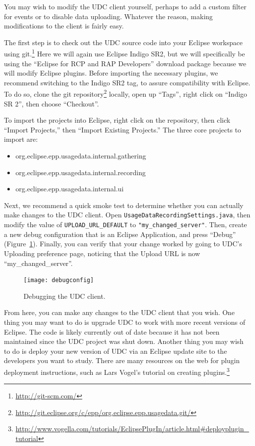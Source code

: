 You may wish to modify the UDC client yourself, perhaps to add a custom filter for events
or to disable data uploading.
Whatever the reason, making modifications to the client is fairly easy.

The first step is to check out the UDC source code into your Eclipse
workspace using git.\footnote{\url{http://git-scm.com/}}
Here we will again use Eclipse Indigo SR2, but we will specifically be using the 
``Eclipse for RCP and RAP Developers'' download package because we will
modify Eclipse plugins.
Before importing the necessary plugins, we recommend switching to 
the Indigo SR2 tag, to assure compatibility with
Eclipse.
To do so, clone the git repository\footnote{\url{http://git.eclipse.org/c/epp/org.eclipse.epp.usagedata.git/}} 
locally, open up ``Tags'', right click on ``Indigo SR 2'',
then choose ``Checkout''.

To import the projects into Eclipse, right click on the repository, then click 
``Import Projects,'' then ``Import Existing Projects.''
The three core projects to import are:

\begin{itemize}
\item org.eclipse.epp.usagedata.internal.gathering
\item org.eclipse.epp.usagedata.internal.recording
\item org.eclipse.epp.usagedata.internal.ui
\end{itemize}

Next, we recommend a quick smoke test to determine whether you 
can actually make changes to the UDC client.
Open \texttt{UsageDataRecordingSettings.java}, then modify the value of \texttt{UPLOAD\_URL\_DEFAULT}
to \texttt{"my\_changed\_server"}.
Then, create a new debug configuration that is an Eclipse Application, and press 
``Debug'' (Figure~\ref{fig:debugconfig}).
Finally, you can verify that your change worked by going to UDC's Uploading 
preference page, noticing that the Upload URL is now ``my\_changed\_server''.

\begin{figure}
  \centering
  \texttt{[image: debugconfig]}
  \caption{Debugging the UDC client.}\label{fig:debugconfig}
\end{figure}

From here, you can make any changes to the UDC client that you wish.
One thing you may want to do is upgrade UDC to work with more recent versions
of Eclipse.
The code is likely currently out of date
because it has not been maintained since the UDC project was shut down.
Another thing you may wish to do is deploy your new version of UDC via
an Eclipse update site to the developers you want to study.
There are many resources on the web for plugin deployment instructions,
such as Lars Vogel's tutorial on creating 
plugins.\footnote{\url{http://www.vogella.com/tutorials/EclipsePlugIn/article.html#deployplugin_tutorial}}

